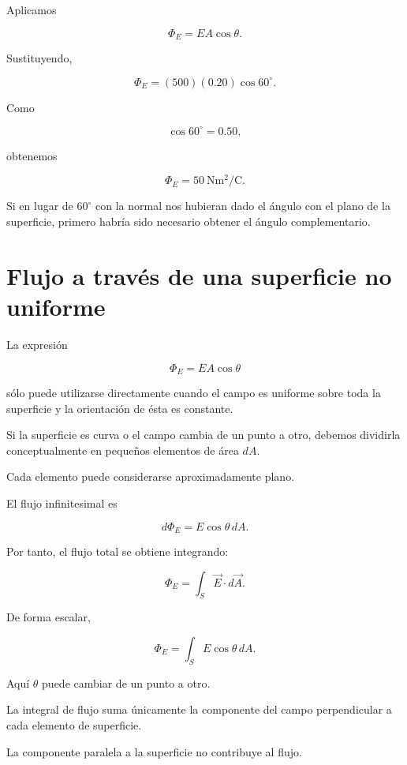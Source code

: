 Aplicamos

\[
\Phi_E=EA\cos\theta.
\]

Sustituyendo,

\[
\Phi_E=(500)(0.20)\cos60^\circ.
\]

Como

\[
\cos60^\circ=0.50,
\]

obtenemos

\[
\boxed{
\Phi_E=\SI{50}{\newton\metre\squared\per\coulomb}
}.
\]

Si en lugar de \(60^\circ\) con la normal nos hubieran dado el ángulo con el plano de
la superficie, primero habría sido necesario obtener el ángulo complementario.


\section{Flujo a través de una superficie no uniforme}

La expresión

\[
\Phi_E=EA\cos\theta
\]

sólo puede utilizarse directamente cuando el campo es uniforme sobre toda la superficie
y la orientación de ésta es constante.

Si la superficie es curva o el campo cambia de un punto a otro, debemos dividirla
conceptualmente en pequeños elementos de área \(dA\).

Cada elemento puede considerarse aproximadamente plano.

El flujo infinitesimal es

\[
d\Phi_E=E\cos\theta\,dA.
\]

Por tanto, el flujo total se obtiene integrando:

\begin{equation}
\boxed{
\Phi_E=\int_S \vec E\cdot d\vec A
}.
\label{eq:flujo_superficie_general}
\end{equation}

De forma escalar,

\[
\boxed{
\Phi_E=\int_S E\cos\theta\,dA
}.
\]

Aquí \(\theta\) puede cambiar de un punto a otro.


\begin{idea}

La integral de flujo suma únicamente la componente del campo perpendicular a cada
elemento de superficie.

La componente paralela a la superficie no contribuye al flujo.

\end{idea}



